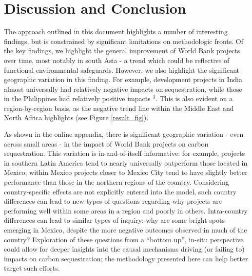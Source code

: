 \documentclass[sustainability,article,submit,moreauthors,pdftex,10pt,a4paper]{mdpi}
\begin{document}
\section{Discussion and Conclusion}
The approach outlined in this document highlights a number of interesting findings, but is constrained by significant limitations on methodologic fronts. Of the key findings, we highlight the general improvement of World Bank projects over time, most notably in south Asia - a trend which could be reflective of functional environmental safeguards. However, we also highlight the significant geographic variation in this finding.  For example, development projects in India almost universally had relatively negative impacts on sequestration, while those in the Philippines had relatively positive impacts \begin{math}^{3}\end{math}. This is also evident on a region-by-region basis, as the negative trend line within the Middle East and North Africa highlights (see Figure \ref{result_fig}).
\par
As shown in the online appendix, there is significant geographic variation - even across small areas - in the impact of World Bank projects on carbon sequestration.  This variation is in-and-of-itself informative: for example, projects in southern Latin America tend to nearly universally outperform those located in Mexico; within Mexico projects closer to Mexico City tend to have slightly better performance than those in the northern regions of the country.  Considering country-specific effects are not explicitly entered into the model, such country differences can lead to new types of questions regarding why projects are performing well within some areas in a region and poorly in others. Intra-country differences can lead to similar types of inquiry: why are some bright spots emerging in Mexico, despite the more negative outcomes observed in much of the country?  Exploration of these questions from a “bottom up”, in-situ perspective could allow for deeper insights into the causal mechanisms driving (or failing to) impacts on carbon sequestration; the methodology presented here can help better target such efforts.
\par
\end{document}
